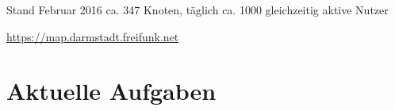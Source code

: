 \documentclass[10pt]{beamer}
\begin{document}
    \begin{frame}{Stand Februar 2016}
      ca. 347 Knoten, täglich ca. 1000 gleichzeitig aktive Nutzer
      \begin{center}
        \vfill
        \begin{center}
        \end{center}
        \vfill
        \url{https://map.darmstadt.freifunk.net}
      \end{center}
    \end{frame}

  \section{Aktuelle Aufgaben}
\end{document}
